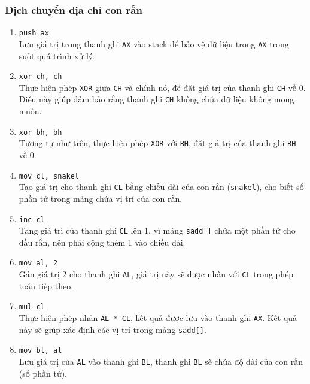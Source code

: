 \documentclass[12pt]{article}
\begin{document}
\subsubsection*{Dịch chuyển địa chỉ con rắn}
\begin{enumerate}[label=\textbf{\arabic*.}]
    \begin{figure}[H]
  \centering
  \texttt{[image: pics/shift\_addrs.png]}
\end{figure}
    \item \texttt{push ax} \\
    Lưu giá trị trong thanh ghi \texttt{AX} vào stack để bảo vệ dữ liệu trong \texttt{AX} trong suốt quá trình xử lý.

    \item \texttt{xor ch, ch} \\
    Thực hiện phép \texttt{XOR} giữa \texttt{CH} và chính nó, để đặt giá trị của thanh ghi \texttt{CH} về 0. 
    Điều này giúp đảm bảo rằng thanh ghi \texttt{CH} không chứa dữ liệu không mong muốn.

    \item \texttt{xor bh, bh} \\
    Tương tự như trên, thực hiện phép \texttt{XOR} với \texttt{BH}, đặt giá trị của thanh ghi \texttt{BH} về 0.

    \item \texttt{mov cl, snakel} \\
    Tạo giá trị cho thanh ghi \texttt{CL} bằng chiều dài của con rắn (\texttt{snakel}), cho biết số phần tử trong mảng chứa vị trí của con rắn.

    \item \texttt{inc cl} \\
    Tăng giá trị của thanh ghi \texttt{CL} lên 1, vì mảng \texttt{sadd[]} chứa một phần tử cho đầu rắn, nên phải cộng thêm 1 vào chiều dài.

    \item \texttt{mov al, 2} \\
    Gán giá trị 2 cho thanh ghi \texttt{AL}, giá trị này sẽ được nhân với \texttt{CL} trong phép toán tiếp theo.

    \item \texttt{mul cl} \\
    Thực hiện phép nhân \texttt{AL * CL}, kết quả được lưu vào thanh ghi \texttt{AX}. Kết quả này sẽ giúp xác định các vị trí trong mảng \texttt{sadd[]}.

    \item \texttt{mov bl, al} \\
    Lưu giá trị của \texttt{AL} vào thanh ghi \texttt{BL}, thanh ghi \texttt{BL} sẽ chứa độ dài của con rắn (số phần tử).


\end{enumerate}
\end{document}

